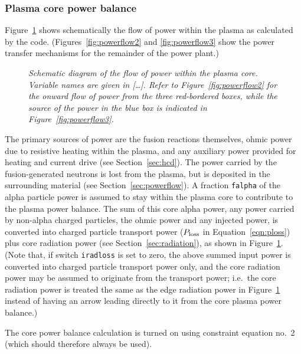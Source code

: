 \documentclass[11pt,a4paper]{report}
\begin{document}
\subsubsection{Plasma core power balance}
\label{sec:corepower}

Figure~\ref{fig:powerflow1} shows schematically the flow of power within the
plasma as calculated by the code. (Figures~\ref{fig:powerflow2} and
\ref{fig:powerflow3} show the power transfer mechanisms for the remainder of
the power plant.)

\begin{figure}[tbph]
\caption[Power balance within the core plasma] {\label{fig:powerflow1}
  \textit{Schematic diagram of the flow of power within the plasma
    core. Variable names are given in [\ldots]. Refer to
  Figure~\ref{fig:powerflow2} for the onward flow of power from the three
  red-bordered boxes, while the source of the power in the blue box is
  indicated in Figure~\ref{fig:powerflow3}.} }
\end{figure}

The primary sources of power are the fusion reactions themselves, ohmic power
due to resistive heating within the plasma, and any auxiliary power provided
for heating and current drive (see Section~\ref{sec:hcd}). The power carried
by the fusion-generated neutrons is lost from the plasma, but is deposited in
the surrounding material (see Section~\ref{sec:powerflow}). A fraction
\texttt{falpha} of the alpha particle power is assumed to stay within the
plasma core to contribute to the plasma power balance. The sum of this core
alpha power, any power carried by non-alpha charged particles, the ohmic power
and any injected power, is converted into charged particle transport power
($P_{\mbox{\scriptsize loss}}$ in Equation~\ref{eqn:ploss}) plus core
radiation power (see Section~\ref{sec:radiation}), as shown in
Figure~\ref{fig:powerflow1}. (Note that, if switch \texttt{iradloss} is set to
zero, the above summed input power is converted into charged particle
transport power only, and the core radiation power may be assumed to originate
from the transport power; i.e.\ the core radiation power is treated the same
as the edge radiation power in Figure~\ref{fig:powerflow1} instead of having
an arrow leading directly to it from the core plasma power balance.)

The core power balance calculation is turned on using constraint equation
no.\ 2 (which should therefore always be used).
\end{document}
